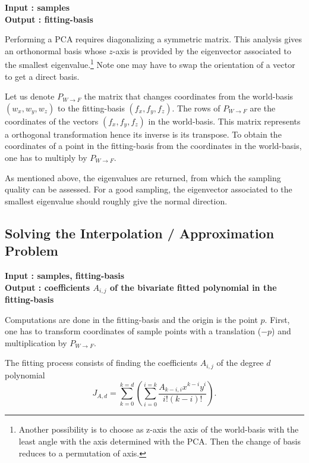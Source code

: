 \begin{ccAdvanced}
{\bf Input : samples\\ Output : fitting-basis}


%
%
Performing a PCA requires diagonalizing a symmetric matrix.  This
analysis gives an orthonormal basis whose $z$-axis is provided by the
eigenvector associated to the smallest eigenvalue.\footnote{Another
  possibility is to choose as z-axis the axis of the world-basis with
  the least angle with the axis determined with the PCA. Then the
  change of basis reduces to a permutation of axis.} Note one may have
to swap the orientation of a vector to get a direct basis.

Let us denote $P_{W\rightarrow F}$ the matrix that changes coordinates from the
world-basis $(w_x,w_y,w_z)$ to the fitting-basis $(f_x,f_y,f_z)$. The
rows of $P_{W\rightarrow F}$ are the coordinates of the vectors
$(f_x,f_y,f_z)$ in the world-basis. This matrix represents a
orthogonal transformation hence its inverse is its transpose. To obtain
the coordinates of a point in the fitting-basis from the coordinates
in the world-basis, one has to multiply by $ P_{W\rightarrow F}$.

As mentioned above, the eigenvalues are returned, from which the
sampling quality can be assessed. For a good sampling, the eigenvector
associated to the smallest eigenvalue should roughly give the normal
direction.

\subsection{Solving the Interpolation / Approximation Problem}
\label{sec:solving}

{\bf Input : samples, fitting-basis \\ Output : coefficients $A_{i,j}$
of the bivariate fitted polynomial in the fitting-basis }

Computations are done in the fitting-basis and the origin is the point
$p$. First, one has to transform coordinates of sample points with a
translation ($-p$) and multiplication by $ P_{W\rightarrow F}$.

The fitting process consists of finding the coefficients
$A_{i,j}$ of the degree $d$ polynomial 
\begin{equation}
\label{eq-answer}
J_{A,d}= \sum_{k=0}^{k=d}(\sum_{i=0}^{i=k}
\frac{A_{k-i,i}x^{k-i}y^{i}}{i!(k-i)!}).
\end{equation}



\end{ccAdvanced}

